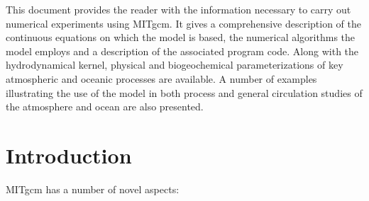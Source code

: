 








This document provides the reader with the information necessary to
carry out numerical experiments using MITgcm. It gives a comprehensive
description of the continuous equations on which the model is based, the
numerical algorithms the model employs and a description of the associated
program code. Along with the hydrodynamical kernel, physical and
biogeochemical parameterizations of key atmospheric and oceanic processes
are available. A number of examples illustrating the use of the model in
both process and general circulation studies of the atmosphere and ocean are
also presented.

\section{Introduction}

MITgcm has a number of novel aspects:

